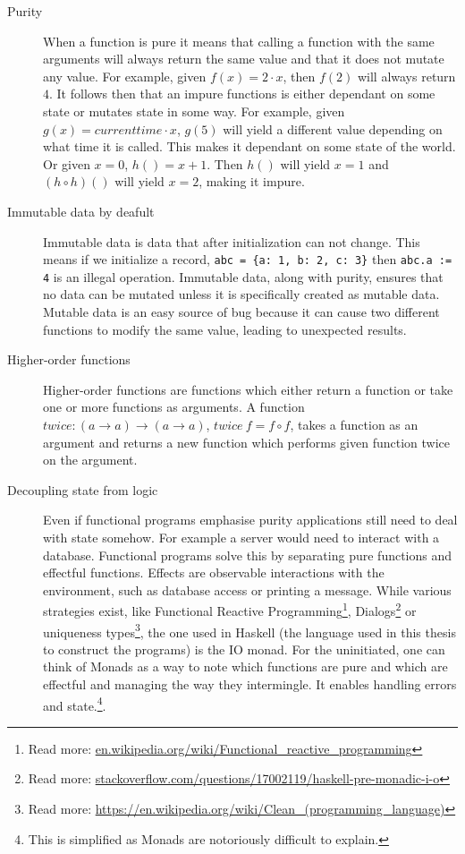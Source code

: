 \begin{description}
\item[ Purity ]

When a function is pure it means that calling a function with the same arguments
        will always return the same value and that it does not mutate any value.
        For example, given $f(x) = 2\cdot x$, then $f(2)$ will always
        return $4$. It follows then that an impure functions is either dependant
        on some state or mutates state in some way. For example, given $g(x) =
        currenttime \cdot x$, $g(5)$ will yield a different value depending on
        what time it is called. This makes it dependant on some state of the
        world. Or given $x=0$, $h()=x+1$. Then $h()$ will yield $x=1$ and $(h
        \circ h)()$ will yield $x=2$, making it impure.~\cite{wikipedia_pure}

\item[ Immutable data by deafult ]

Immutable data is data that after initialization can not change. This means if
we initialize a record, \texttt{abc = \{a: 1, b: 2, c: 3\}} then \texttt{abc.a
:= 4} is an illegal operation. Immutable data, along with purity, ensures that
no data can be mutated unless it is specifically created as mutable data.
Mutable data is an easy source of bug because it can cause two different
functions to modify the same value, leading to unexpected results.

\item[Higher-order functions]

	Higher-order functions are functions which either return a function or take
one or more functions as arguments. A function $twice : (a\rightarrow
a)\rightarrow (a\rightarrow a)$, $twice\ f = f \circ f$, takes a function as an
argument and returns a new function which performs given function twice on the
argument. 

\item[Decoupling state from logic]

Even if functional programs emphasise purity applications still need to deal
        with state somehow. For example a server would need to interact with a
        database. Functional programs solve this by separating pure functions
        and effectful functions. Effects are observable interactions with the
        environment, such as database access or printing a message.  While
        various strategies exist, like Functional Reactive
        Programming\footnote{Read more:
        \url{en.wikipedia.org/wiki/Functional_reactive_programming}},
        Dialogs\footnote{Read more:
        \url{stackoverflow.com/questions/17002119/haskell-pre-monadic-i-o}} or
        uniqueness types\footnote{Read more:
        \url{https://en.wikipedia.org/wiki/Clean_(programming_language)}}, the
        one used in Haskell (the language used in this thesis to construct the
        programs) is the IO monad. For the uninitiated, one can think of Monads
        as a way to note which functions are pure and which are effectful and
        managing the way they intermingle. It enables handling errors
        and state.\footnote{This is simplified as Monads are notoriously
        difficult to explain.}. 


\end{description}
